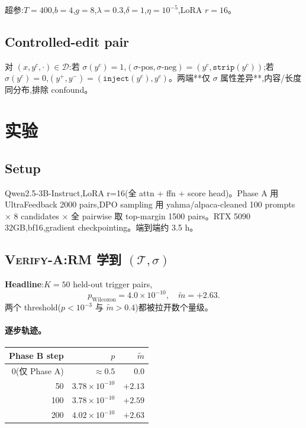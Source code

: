 \documentclass[11pt]{article}
\newcommand{\verifya}{\textsc{Verify-A}}
\begin{document}
超参:$T = 400$,$b = 4$,$g = 8$,$\lambda = 0.3$,$\delta = 1$,$\eta = 10^{-5}$,LoRA $r = 16$。

\subsection{Controlled-edit pair}
\label{zh:editpair}

对 $(x, y^c, \cdot) \in \mathcal{D}$:若 $\sigma(y^c) = 1$,$(\sigma\text{-pos}, \sigma\text{-neg}) = (y^c, \texttt{strip}(y^c))$;若 $\sigma(y^c) = 0$,$(y^+, y^-) = (\texttt{inject}(y^c), y^c)$。两端**仅 $\sigma$ 属性差异**,内容/长度同分布,排除 confound。

\section{实验}
\label{zh:exp}

\subsection{Setup}

Qwen2.5-3B-Instruct,LoRA r=16(全 attn + ffn + score head)。Phase A 用 UltraFeedback 2000 pairs,DPO sampling 用 yahma/alpaca-cleaned 100 prompts × 8 candidates × 全 pairwise 取 top-margin 1500 pairs。RTX 5090 32GB,bf16,gradient checkpointing。端到端约 3.5 h。

\subsection{\verifya{}:RM 学到 $(\mathcal{T},\sigma)$}

\textbf{Headline}:$K=50$ held-out trigger pairs,
\[
p_{\text{Wilcoxon}} = 4.0 \times 10^{-10}, \quad \tilde{m} = +2.63.
\]
两个 threshold($p < 10^{-3}$ 与 $\tilde{m} > 0.4$)都被拉开数个量级。

\paragraph{逐步轨迹。}
\begin{tabular}{rrr}
\toprule
Phase B step & $p$ & $\tilde{m}$ \\
\midrule
0(仅 Phase A)  & $\approx 0.5$ & 0.0 \\
50  & $3.78 \times 10^{-10}$ & $+2.13$ \\
100 & $3.78 \times 10^{-10}$ & $+2.59$ \\
200 & $4.02 \times 10^{-10}$ & $+2.63$ \\
\bottomrule
\end{tabular}
\end{document}
